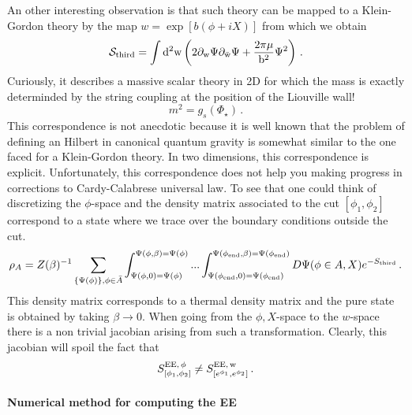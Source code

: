 \documentclass[a4paper]{article}
\begin{document}
An other interesting observation is that such theory can be mapped to a Klein-Gordon theory by the map $w = \exp\left[b\left(\phi+iX\right)\right]$ from which we obtain
\begin{equation}
  \mathcal{S}_{\rm third} = \int \rm{d}^2w \left(2 \partial_w\Psi\partial_{\bar{w}}\Psi + \frac{2\pi \mu}{b^2} \Psi^2\right)\,.
\end{equation}
Curiously, it describes a massive scalar theory in 2D for which the mass is exactly determinded by the string coupling at the position of the Liouville wall! 
\begin{equation}
  m^2 = g_s(\Phi_\star)\,.
\end{equation}
This correspondence is not anecdotic because it is well known that the problem of defining an Hilbert in canonical quantum gravity is somewhat similar to the one faced for a Klein-Gordon theory. In two dimensions, this correspondence is explicit. Unfortunately, this correspondence does not help you making progress in corrections to Cardy-Calabrese universal law. To see that one could think of discretizing the $\phi$-space and the density matrix associated to the cut $[\phi_1,\phi_2]$ correspond to a state where we trace over the boundary conditions outside the cut.
\begin{equation}
  \rho_A=Z(\beta)^{-1}\sum_{\{\Psi(\phi)\},\phi \in \bar{A}}\int_{\Psi(\phi,0)=\Psi(\phi)}^{\Psi(\phi,\beta)=\Psi(\phi)} ... \int_{\Psi(\phi_{\rm end},0)=\Psi(\phi_{\rm end})}^{\Psi(\phi_{\rm end},\beta)=\Psi(\phi_{\rm end})} D\Psi(\phi \in A, X) e^{-S_{\rm third}}\,.
\end{equation}
This density matrix corresponds to a thermal density matrix and the pure state is obtained by taking $\beta\to0$. When going from the $\phi,X$-space to the $w$-space there is a non trivial jacobian arising from such a transformation. Clearly, this jacobian will spoil the fact that
\begin{equation}
  S^{\rm{EE},\,\phi}_{[\phi_1,\phi_2]} \neq S^{\rm{EE},\,w}_{{[e^{\phi_1},e^{\phi_2}]}}\,.
\end{equation}

\paragraph{Numerical method for computing the EE}
\end{document}
